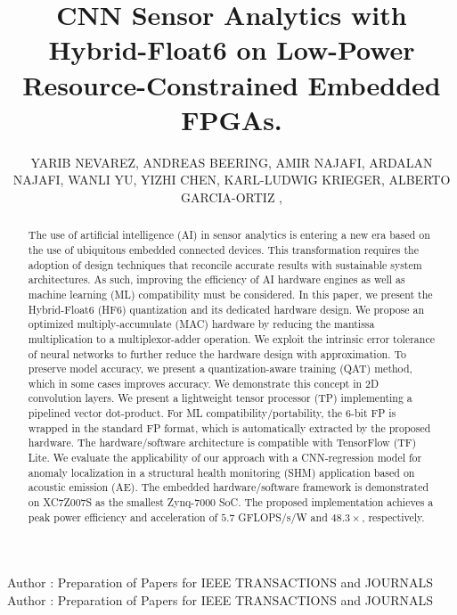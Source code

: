 \title {CNN Sensor Analytics with Hybrid-Float6 on Low-Power Resource-Constrained Embedded FPGAs.}

\author{
	\uppercase{Yarib Nevarez},
	\uppercase{Andreas Beering},
	\uppercase{Amir Najafi},
	\uppercase{Ardalan Najafi},
	\uppercase{Wanli Yu},
	\uppercase{Yizhi Chen},
	\uppercase{Karl-Ludwig Krieger},
	\uppercase{Alberto Garcia-Ortiz} ,
}

\address[1]{Institute of Electrodynamics and Microelectronics, University of Bremen, Bremen 28359, Germany}

\address[2]{School of Electrical Engineering and Computer Science, KTH Royal Institute of Technology, 10044 Stockholm, Sweden}



\markboth
{Author \headeretal: Preparation of Papers for IEEE TRANSACTIONS and JOURNALS}
{Author \headeretal: Preparation of Papers for IEEE TRANSACTIONS and JOURNALS}


\begin{abstract}
The use of artificial intelligence (AI) in sensor analytics is entering a new era based on the use of ubiquitous embedded connected devices. This transformation requires the adoption of design techniques that reconcile accurate results with sustainable system architectures. As such, improving the efficiency of AI hardware engines as well as machine learning (ML) compatibility must be considered. In this paper, we present the Hybrid-Float6 (HF6) quantization and its dedicated hardware design. We propose an optimized multiply-accumulate (MAC) hardware by reducing the mantissa multiplication to a multiplexor-adder operation. We exploit the intrinsic error tolerance of neural networks to further reduce the hardware design with approximation. To preserve model accuracy, we present a quantization-aware training (QAT) method, which in some cases improves accuracy. We demonstrate this concept in 2D convolution layers. We present a lightweight tensor processor (TP) implementing a pipelined vector dot-product. For ML compatibility/portability, the 6-bit FP is wrapped in the standard FP format, which is automatically extracted by the proposed hardware. The hardware/software architecture is compatible with TensorFlow (TF) Lite. We evaluate the applicability of our approach with a CNN-regression model for anomaly localization in a structural health monitoring (SHM) application based on acoustic emission (AE). The embedded hardware/software framework is demonstrated on XC7Z007S as the smallest Zynq-7000 SoC. The proposed implementation achieves a peak power efficiency and acceleration of $5.7$ GFLOPS/s/W and $48.3\times$, respectively.
\end{abstract}

